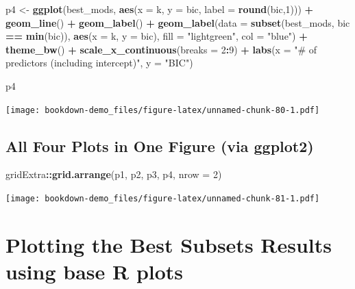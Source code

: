 \documentclass[]{book}
\newenvironment{Shaded}{\begin{snugshade}}{\end{snugshade}}
\newcommand{\KeywordTok}[1]{\textcolor[rgb]{0.13,0.29,0.53}{\textbf{#1}}}
\newcommand{\DataTypeTok}[1]{\textcolor[rgb]{0.13,0.29,0.53}{#1}}
\newcommand{\DecValTok}[1]{\textcolor[rgb]{0.00,0.00,0.81}{#1}}
\newcommand{\StringTok}[1]{\textcolor[rgb]{0.31,0.60,0.02}{#1}}
\newcommand{\OperatorTok}[1]{\textcolor[rgb]{0.81,0.36,0.00}{\textbf{#1}}}
\newcommand{\NormalTok}[1]{#1}
\theoremstyle{definition}
\theoremstyle{definition}
\theoremstyle{definition}
\theoremstyle{remark}
\begin{document}
\begin{Shaded}
\begin{Highlighting}[]
\NormalTok{p4 <-}\StringTok{ }\KeywordTok{ggplot}\NormalTok{(best_mods, }\KeywordTok{aes}\NormalTok{(}\DataTypeTok{x =}\NormalTok{ k, }\DataTypeTok{y =}\NormalTok{ bic,}
                            \DataTypeTok{label =} \KeywordTok{round}\NormalTok{(bic,}\DecValTok{1}\NormalTok{))) }\OperatorTok{+}
\StringTok{    }\KeywordTok{geom_line}\NormalTok{() }\OperatorTok{+}
\StringTok{    }\KeywordTok{geom_label}\NormalTok{() }\OperatorTok{+}
\StringTok{    }\KeywordTok{geom_label}\NormalTok{(}\DataTypeTok{data =} \KeywordTok{subset}\NormalTok{(best_mods, bic }\OperatorTok{==}\StringTok{ }\KeywordTok{min}\NormalTok{(bic)),}
               \KeywordTok{aes}\NormalTok{(}\DataTypeTok{x =}\NormalTok{ k, }\DataTypeTok{y =}\NormalTok{ bic),}
               \DataTypeTok{fill =} \StringTok{"lightgreen"}\NormalTok{, }\DataTypeTok{col =} \StringTok{"blue"}\NormalTok{) }\OperatorTok{+}
\StringTok{    }\KeywordTok{theme_bw}\NormalTok{() }\OperatorTok{+}
\StringTok{    }\KeywordTok{scale_x_continuous}\NormalTok{(}\DataTypeTok{breaks =} \DecValTok{2}\OperatorTok{:}\DecValTok{9}\NormalTok{) }\OperatorTok{+}
\StringTok{    }\KeywordTok{labs}\NormalTok{(}\DataTypeTok{x =} \StringTok{"# of predictors (including intercept)"}\NormalTok{,}
         \DataTypeTok{y =} \StringTok{"BIC"}\NormalTok{)}

\NormalTok{p4}
\end{Highlighting}
\end{Shaded}

\texttt{[image: bookdown-demo\_files/figure-latex/unnamed-chunk-80-1.pdf]}

\subsection{All Four Plots in One Figure (via
ggplot2)}\label{all-four-plots-in-one-figure-via-ggplot2}

\begin{Shaded}
\begin{Highlighting}[]
\NormalTok{gridExtra}\OperatorTok{::}\KeywordTok{grid.arrange}\NormalTok{(p1, p2, p3, p4, }\DataTypeTok{nrow =} \DecValTok{2}\NormalTok{)}
\end{Highlighting}
\end{Shaded}

\texttt{[image: bookdown-demo\_files/figure-latex/unnamed-chunk-81-1.pdf]}

\section{Plotting the Best Subsets Results using base R
plots}\label{plotting-the-best-subsets-results-using-base-r-plots}
\end{document}
